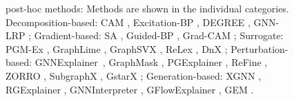 \begin{figure}[t]
{{        %
        post-hoc methods:} Methods are shown in the individual categories. Decomposition-based: CAM \cite{Excitation-BP}, Excitation-BP \cite{Excitation-BP}, DEGREE \cite{degree}, GNN-LRP \cite{GNN-LRP}; Gradient-based: SA \cite{guided-bp} , Guided-BP \cite{guided-bp} , Grad-CAM \cite{Excitation-BP}; Surrogate: PGM-Ex \cite{pgexplainer}, GraphLime \cite{graphlime}, GraphSVX \cite{graphsvx}, ReLex \cite{RELex}, DnX \cite{distilexplain}; Perturbation-based: GNNExplainer~\cite{ying2019gnnexplainer}, GraphMask \cite{Graph-mask}, PGExplainer \cite{pgexplainer}, ReFine \cite{ReFine}, ZORRO \cite{zorro}, SubgraphX \cite{subgraphX}, GstarX \cite{gstarx}; Generation-based: XGNN \cite{xgnn}, RGExplainer \cite{RL-enhanced}, GNNInterpreter \cite{gnninterpreter}, GFlowExplainer \cite{Gflow}, GEM \cite{Gen-causal}.}
        \label{}
\end{figure}



